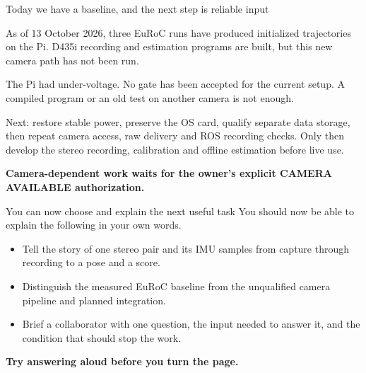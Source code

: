 \documentclass[aspectratio=169,12pt,t]{beamer}
\newcommand{\para}[1]{#1\par\medskip}
\newcommand{\lesson}[1]{\vfill{\color{teal!70!black}\bfseries #1}\par}
\begin{document}
\begin{frame}{Today we have a baseline, and the next step is reliable input}

\para{As of 13 October 2026, three EuRoC runs have produced initialized trajectories on the Pi. D435i recording and estimation programs are built, but this new camera path has not been run.}
\para{The Pi had under-voltage. No gate has been accepted for the current setup. A compiled program or an old test on another camera is not enough.}
\para{Next: restore stable power, preserve the OS card, qualify separate data storage, then repeat camera access, raw delivery and ROS recording checks. Only then develop the stereo recording, calibration and offline estimation before live use.}
\lesson{Camera-dependent work waits for the owner's explicit CAMERA AVAILABLE authorization.}

\end{frame}

\begin{frame}{You can now choose and explain the next useful task}
\para{You should now be able to explain the following in your own words.}
\begin{itemize}
\item Tell the story of one stereo pair and its IMU samples from capture through recording to a pose and a score.
\item Distinguish the measured EuRoC baseline from the unqualified camera pipeline and planned integration.
\item Brief a collaborator with one question, the input needed to answer it, and the condition that should stop the work.
\end{itemize}
\lesson{Try answering aloud before you turn the page.}
\end{frame}
\end{document}
